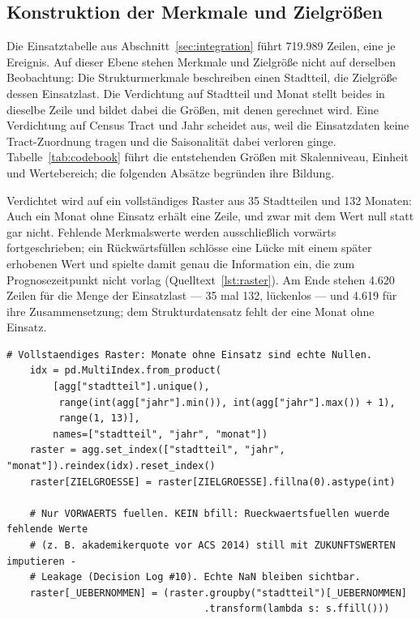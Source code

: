 \subsection{Konstruktion der Merkmale und Zielgrößen}
\label{sec:merkmale}

Die Einsatztabelle aus Abschnitt~\ref{sec:integration} führt 719.989 Zeilen,
eine je Ereignis. Auf dieser Ebene stehen Merkmale und Zielgröße nicht auf
derselben Beobachtung: Die Strukturmerkmale beschreiben einen Stadtteil, die
Zielgröße dessen Einsatzlast. Die Verdichtung auf Stadtteil und Monat stellt
beides in dieselbe Zeile und bildet dabei die Größen, mit denen gerechnet wird.
Eine Verdichtung auf Census Tract und Jahr scheidet aus, weil die Einsatzdaten
keine Tract-Zuordnung tragen und die Saisonalität dabei verloren ginge.
Tabelle~\ref{tab:codebook} führt die entstehenden Größen mit Skalenniveau,
Einheit und Wertebereich; die folgenden Absätze begründen ihre Bildung.

Verdichtet wird auf ein vollständiges Raster aus 35 Stadtteilen und 132
Monaten: Auch ein Monat ohne Einsatz erhält eine Zeile, und zwar mit dem Wert
null statt gar nicht. Fehlende Merkmalswerte werden ausschließlich vorwärts
fortgeschrieben; ein Rückwärtsfüllen schlösse eine Lücke mit einem später
erhobenen Wert und spielte damit genau die Information ein, die zum
Prognosezeitpunkt nicht vorlag (Quelltext~\ref{lst:raster}). Am Ende stehen
4.620 Zeilen für die Menge der Einsatzlast --- 35 mal 132, lückenlos --- und
4.619 für ihre Zusammensetzung; dem Strukturdatensatz fehlt der eine Monat ohne
Einsatz.

\begin{lstlisting}[style=pythonstil,
  label={lst:raster},
  caption={Vollständiges Raster und Vorwärtsfüllen
           (\texttt{prep/s2\_datensaetze.py}, Z.~220--235)}]
    # Vollstaendiges Raster: Monate ohne Einsatz sind echte Nullen.
    idx = pd.MultiIndex.from_product(
        [agg["stadtteil"].unique(),
         range(int(agg["jahr"].min()), int(agg["jahr"].max()) + 1),
         range(1, 13)],
        names=["stadtteil", "jahr", "monat"])
    raster = agg.set_index(["stadtteil", "jahr", "monat"]).reindex(idx).reset_index()
    raster[ZIELGROESSE] = raster[ZIELGROESSE].fillna(0).astype(int)

    # Nur VORWAERTS fuellen. KEIN bfill: Rueckwaertsfuellen wuerde fehlende Werte
    # (z. B. akademikerquote vor ACS 2014) still mit ZUKUNFTSWERTEN imputieren -
    # Leakage (Decision Log #10). Echte NaN bleiben sichtbar.
    raster[_UEBERNOMMEN] = (raster.groupby("stadtteil")[_UEBERNOMMEN]
                                  .transform(lambda s: s.ffill()))
\end{lstlisting}


